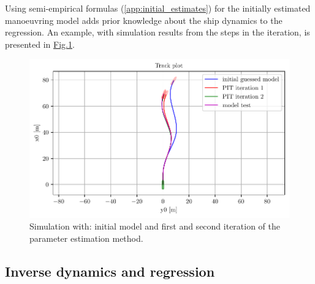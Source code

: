 \noindent Using semi-empirical formulas (\autoref{app:initial_estimates}) for the initially estimated manoeuvring model adds prior knowledge about the ship dynamics to the regression. An example, with simulation results from the steps in the iteration, is presented in \hyperref[\detokenize{01.01_method:iterations}]{Fig.\@\ref{\detokenize{01.01_method:iterations}}}.


\begin{figure}[H]
    \centering
    \includegraphics[width=\textwidth]{kappa/images/0.pdf}
    \caption{Simulation with: initial model and first and second iteration of the parameter estimation method.}
    \label{\detokenize{01.01_method:iterations}}
\end{figure}

\subsection{Inverse dynamics and regression}
\label{\detokenize{03.01_inverse_dynamics:inverse-dynamics-and-regression}}\label{\detokenize{03.01_inverse_dynamics::doc}}

